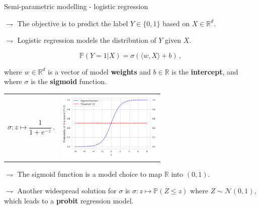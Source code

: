 \documentclass[9pt]{beamer}
\newcommand\R{\mathds{R}}
\renewcommand{\P}{\mathds{P}}
\begin{document}

\begin{frame}{Semi-parametric modelling - logistic regression}


$\rightharpoondown$ The objective is to \alert{predict the  label $Y\in\{0,1\}$} based on $X\in\mathbb{R}^d$.

$\rightharpoondown$ Logistic regression \alert{models the distribution of $Y$ given $X$}.

\vspace{-.2cm}

\begin{equation*}
\P(Y = 1| X) = \sigma(\langle w,X \rangle + b)\,,
\end{equation*}

where $w \in \R^d$ is a vector of model \textbf{weights} and $b \in \R$ is the \textbf{intercept}, and where $\sigma$ is the \textbf{sigmoid} function.

\vspace{.3cm}
 
\begin{tabular}{cc}
	\begin{minipage}{0.4\textwidth}
		\begin{equation*}
		\sigma: z \mapsto \frac{1}{1 + e^{-z}}\,.
		\end{equation*}%
	\end{minipage}
	&
	\begin{minipage}{0.4\textwidth}
		\includegraphics[width=5cm]{./sigmoid.png}  
	\end{minipage}    
\end{tabular}

$\rightharpoondown$ The sigmoid function is a \alert{model choice to map $\mathbb{R}$ into $(0,1)$}.

$\rightharpoondown$ Another widespread solution for $\sigma$ is $\sigma: z \mapsto  \P( Z \leqslant z)$ where $Z\sim \mathcal{N}(0,1)$, which leads to a \textbf{probit} regression model.

\end{frame}
\end{document}
